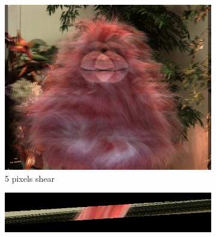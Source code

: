 \documentclass[a4paper]{article}
\begin{document}
\begin{figure}[ht]
\begin{subfigure}[h]{0.48\textwidth}
	  \vspace{2mm}
	  \includegraphics[width=\textwidth]{ShearedInterpolation58_62_shear5}
	  \caption*{5 pixels shear}
	\end{subfigure}
	
	\vspace{2mm}
	\begin{subfigure}[h]{0.48\textwidth}
	  \includegraphics[width=\textwidth]{shear16}
	  

\end{subfigure}
\end{figure}
\end{document}
